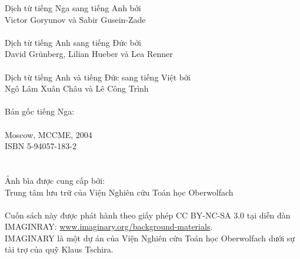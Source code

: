 \clearpage
\null\vfill
\noindent
Dịch từ tiếng Nga sang tiếng Anh bởi \\
\null\quad Victor Goryunov và  Sabir Gusein-Zade\\
\\
Dịch từ tiếng Anh sang tiếng Đức bởi \\
\null\quad David Gr\"{u}nberg, Lilian Hueber  và  Lea Renner\\
\\
Dịch từ tiếng Anh và tiếng Đức sang tiếng Việt bởi \\
\null\quad  Ngô Lâm Xuân Châu và Lê Công Trình \\
\\
Bản gốc tiếng Nga:\\
\null{}\\
\null\quad Moscow, MCCME, 2004\\
\null\quad ISBN 5-94057-183-2\\
\\
\\
Ảnh bìa được cung cấp bởi:\\ 
\null\quad Trung tâm lưu trữ  của Viện Nghiên cứu Toán học Oberwolfach\\
\\
Cuốn sách này được phát hành theo giấy phép CC BY-NC-SA 3.0 tại diễn đàn IMAGINRAY: \href{http://www.imaginary.org/background-materials}{www.imaginary.org/background-materials}.\\
IMAGINARY là một dự án của Viện Nghiên cứu Toán học Oberwolfach dưới sự tài  trợ của quỹ Klaus Tschira.

